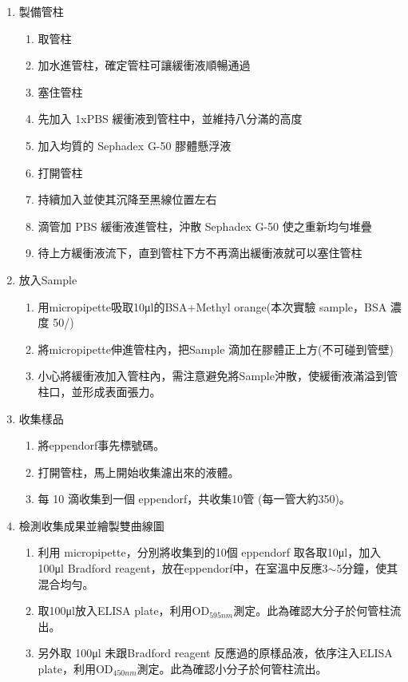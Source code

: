 \begin{enumerate}[label=\arabic*.]
  \item 製備管柱
  \begin{enumerate}[label=(\arabic*)]
    \item 取管柱
  
    \item 加水進管柱，確定管柱可讓緩衝液順暢通過
    \item 塞住管柱
    \item 先加入 1xPBS 緩衝液到管柱中，並維持八分滿的高度
    \item 加入均質的 Sephadex G-50 膠體懸浮液
    \item 打開管柱
    \item 持續加入並使其沉降至黑線位置左右
    \item 滴管加 PBS 緩衝液進管柱，沖散 Sephadex G-50 使之重新均勻堆疊
    \item 待上方緩衝液流下，直到管柱下方不再滴出緩衝液就可以塞住管柱
  \end{enumerate}
  \item 放入Sample
  \begin{enumerate}[label=(\arabic*)]
    \item 用micropipette吸取10μl的BSA+Methyl orange(本次實驗 sample，BSA 濃度 50\mug/\mul)
    \item 將micropipette伸進管柱內，把Sample 滴加在膠體正上方(不可碰到管壁)
    \item 小心將緩衝液加入管柱內，需注意避免將Sample沖散，使緩衝液滿溢到管柱口，並形成表面張力。
  \end{enumerate}
  \item 收集樣品
  \begin{enumerate}[label=(\arabic*)]
    \item 將eppendorf事先標號碼。
    \item 打開管柱，馬上開始收集濾出來的液體。
    \item 每 10 滴收集到一個 eppendorf，共收集10管 (每一管大約350\mul)。
  \end{enumerate}
  \item 檢測收集成果並繪製雙曲線圖
  \begin{enumerate}[label=(\arabic*)]
    \item 利用 micropipette，分別將收集到的10個 eppendorf 取各取10μl，加入 100μl Bradford reagent，放在eppendorf中，在室溫中反應3$\sim$5分鐘，使其混合均勻。
    \item 取100μl放入ELISA plate，利用OD$_{595nm}$測定。此為確認大分子於何管柱流出。
    \item 另外取 100μl 未跟Bradford reagent 反應過的原樣品液，依序注入ELISA plate，利用OD$_{450nm}$測定。此為確認小分子於何管柱流出。

\end{enumerate}
\end{enumerate}
